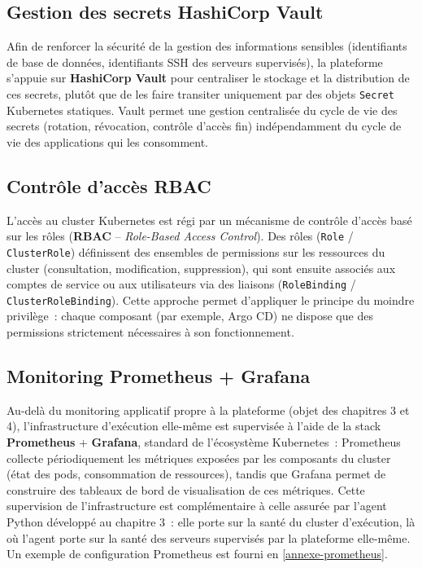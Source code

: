 \subsection{Gestion des secrets HashiCorp Vault}

Afin de renforcer la sécurité de la gestion des informations sensibles (identifiants de base de données, identifiants SSH des serveurs supervisés), la plateforme s'appuie sur \textbf{HashiCorp Vault} pour centraliser le stockage et la distribution de ces secrets, plutôt que de les faire transiter uniquement par des objets \texttt{Secret} Kubernetes statiques. Vault permet une gestion centralisée du cycle de vie des secrets (rotation, révocation, contrôle d'accès fin) indépendamment du cycle de vie des applications qui les consomment.

\subsection{Contrôle d'accès RBAC}

L'accès au cluster Kubernetes est régi par un mécanisme de contrôle d'accès basé sur les rôles (\textbf{RBAC} -- \emph{Role-Based Access Control}). Des rôles (\texttt{Role} / \texttt{ClusterRole}) définissent des ensembles de permissions sur les ressources du cluster (consultation, modification, suppression), qui sont ensuite associés aux comptes de service ou aux utilisateurs via des liaisons (\texttt{RoleBinding} / \texttt{ClusterRoleBinding}). Cette approche permet d'appliquer le principe du moindre privilège~: chaque composant (par exemple, Argo CD) ne dispose que des permissions strictement nécessaires à son fonctionnement.

\subsection{Monitoring Prometheus + Grafana}

Au-delà du monitoring applicatif propre à la plateforme (objet des chapitres 3 et 4), l'infrastructure d'exécution elle-même est supervisée à l'aide de la stack \textbf{Prometheus} + \textbf{Grafana}, standard de l'écosystème Kubernetes~: Prometheus collecte périodiquement les métriques exposées par les composants du cluster (état des pods, consommation de ressources), tandis que Grafana permet de construire des tableaux de bord de visualisation de ces métriques. Cette supervision de l'infrastructure est complémentaire à celle assurée par l'agent Python développé au chapitre 3~: elle porte sur la santé du cluster d'exécution, là où l'agent porte sur la santé des serveurs supervisés par la plateforme elle-même. Un exemple de configuration Prometheus est fourni en \cref{annexe-prometheus}.

